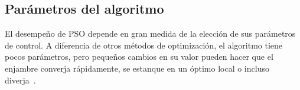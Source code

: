 
\subsection{Parámetros del algoritmo}
\label{sec:parametros}

El desempeño de PSO depende en gran medida de la elección de sus parámetros de control. A diferencia de otros métodos de optimización, el algoritmo tiene pocos parámetros, pero pequeños cambios en su valor pueden hacer que el enjambre converja rápidamente, se estanque en un óptimo local o incluso diverja~\cite{poli2007overview, shi1998parameter}.

